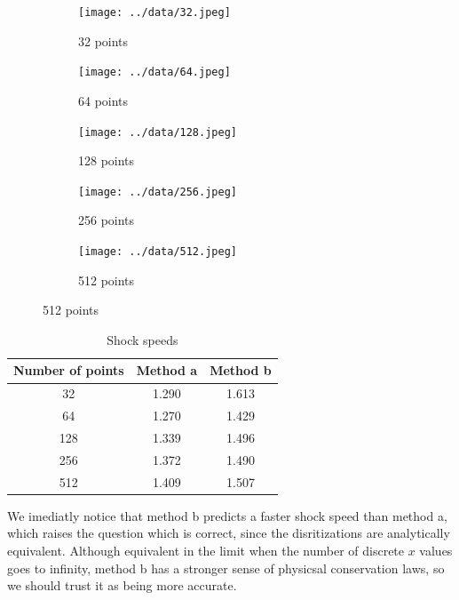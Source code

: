 \documentclass[12pt, letterpaper]{article}
\begin{document}
\begin{figure} [!b]
  \centering
  \caption{Plots at various number of points}
  \begin{subfigure}{0.3\textwidth}
    \centering
    \caption{32 points}
    \texttt{[image: ../data/32.jpeg]}
  \end{subfigure} \hfill \begin{subfigure}{0.3\textwidth}
    \centering
    \caption{64 points}
    \texttt{[image: ../data/64.jpeg]}
  \end{subfigure} \hfill \begin{subfigure}{0.3\textwidth}
    \centering
    \caption{128 points}
    \texttt{[image: ../data/128.jpeg]}
  \end{subfigure}

  \hfill \begin{subfigure}{0.3\textwidth}
    \centering
    \caption{256 points}
    \texttt{[image: ../data/256.jpeg]}
  \end{subfigure} \hfill \begin{subfigure}{0.3\textwidth}
    \centering
    \caption{512 points}
    \texttt{[image: ../data/512.jpeg]}
  \end{subfigure} \hfill
  \label{fig:plots}
\end{figure}

\begin{table}
  \centering
  \caption{Shock speeds}
  \begin{tabular}{c c c}
    \hline\hline
    Number of points & Method a & Method b \\
    \hline
    32  & 1.290 & 1.613 \\
    64  & 1.270 & 1.429 \\
    128 & 1.339 & 1.496 \\
    256 & 1.372 & 1.490 \\
    512 & 1.409 & 1.507 \\
    \hline\hline
  \end{tabular}
  \label{tab:speed}
\end{table}

We imediatly notice that method b predicts a faster shock speed than method a,
which raises the question which is correct, since the disritizations are
analytically equivalent. Although equivalent in the limit when the number of
discrete \(x\) values goes to infinity, method b has a stronger sense of
physicsal conservation laws, so we should trust it as being more accurate.
\end{document}
